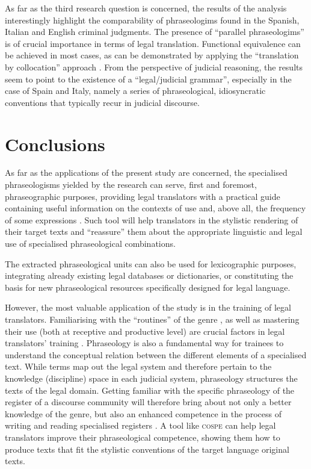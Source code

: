 \documentclass[output=paper]{LSP/langsci}
\begin{document}
As far as the third research question is concerned, the results of the analysis interestingly highlight the comparability of phraseologims found in the Spanish, Italian and English criminal judgments. The presence of “parallel phraseologims” is of crucial importance in terms of legal translation. Functional equivalence \citep[see][]{TogniniBonelli1996} can be achieved in most cases, as can be demonstrated by applying the “translation by collocation” approach \citep[see][]{TogniniBonelli2004,Pontrandolfo2013a}. From the perspective of judicial reasoning, the results seem to point to the existence of a “legal/judicial grammar”, especially in the case of Spain and Italy, namely a series of phraseological, idiosyncratic conventions that typically recur in judicial discourse.

\section{Conclusions}
As far as the applications of the present study are concerned, the specialised phraseologisms yielded by the research can serve, first and foremost, phraseographic purposes, providing legal translators with a practical guide containing useful information on the contexts of use and, above all, the frequency of some expressions \citep[see][]{Lombardi2004}. Such tool will help translators in the stylistic rendering of their target texts and “reassure” them about the appropriate linguistic and legal use of specialised  phraseological combinations.

The extracted phraseological units can also be used for lexicographic purposes, integrating already existing legal databases or dictionaries, or constituting the basis for new phraseological resources specifically designed for legal language.

However, the most valuable application of the study is in the training of legal translators. Familiarising with the “routines” of the genre \citep{Hatim1997}, as well as mastering their use (both at receptive and productive level) are crucial factors in legal translators’ training \citep[see][]{Garzone2007}. Phraseology is also a fundamental way for trainees to understand the conceptual relation between the different elements of a specialised text. While terms map out the legal system and therefore pertain to the knowledge (discipline) space in each judicial system, phraseology structures the texts of the legal domain. Getting familiar with the specific phraseology of the register of a discourse community will therefore bring about not only a better knowledge of the genre, but also an enhanced competence in the process of writing and reading specialised registers \citep[see][]{Williams2002}. A tool like \textsc{cospe} can help legal translators improve their phraseological competence, showing them how to produce texts that fit the stylistic conventions of the target language original texts.
\end{document}

